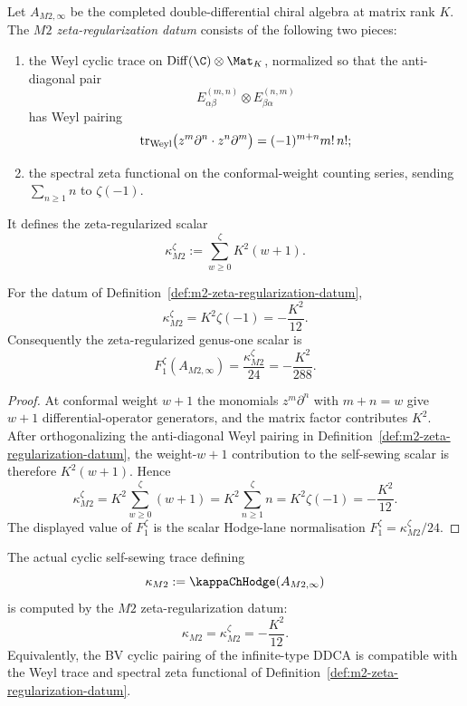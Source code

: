 \begin{definition}
\label{def:m2-zeta-regularization-datum}
Let \(A_{M2,\infty}\) be the completed double-differential chiral
algebra at matrix rank \(K\).  The \emph{\(M2\) zeta-regularization
datum} consists of the following two pieces:
\begin{enumerate}[label=\textup{(\roman*)},leftmargin=1.8em]
\item the Weyl cyclic trace on \(\Diff(\C)\otimes\Mat_K\), normalized
so that the anti-diagonal pair
\[
E^{(m,n)}_{\alpha\beta}\otimes E^{(n,m)}_{\beta\alpha}
\]
has Weyl pairing
\[
\operatorname{tr}_{\mathrm{Weyl}}\bigl(z^m\partial^n\cdot z^n\partial^m\bigr)
=(-1)^{m+n}m!\,n!;
\]
\item the spectral zeta functional on the conformal-weight counting
series, sending \(\sum_{n\ge1} n\) to \(\zeta(-1)\).
\end{enumerate}
It defines the zeta-regularized scalar
\[
\kappa_{M2}^{\zeta}
:=\sum_{w\ge0}^{\zeta} K^2(w+1).
\]
\end{definition}

\begin{proposition}
\label{prop:m2-zeta-regularized-kappa}
For the datum of Definition~\ref{def:m2-zeta-regularization-datum},
\[
\kappa_{M2}^{\zeta}=K^2\zeta(-1)=-\frac{K^2}{12}.
\]
Consequently the zeta-regularized genus-one scalar is
\[
F_1^{\zeta}(A_{M2,\infty})
=\frac{\kappa_{M2}^{\zeta}}{24}
=-\frac{K^2}{288}.
\]
\end{proposition}

\begin{proof}
At conformal weight \(w+1\) the monomials \(z^m\partial^n\) with
\(m+n=w\) give \(w+1\) differential-operator generators, and the
matrix factor contributes \(K^2\).  After orthogonalizing the
anti-diagonal Weyl pairing in Definition~\ref{def:m2-zeta-regularization-datum},
the weight-\(w+1\) contribution to the self-sewing scalar is therefore
\(K^2(w+1)\).  Hence
\[
\kappa_{M2}^{\zeta}
=K^2\sum_{w\ge0}^{\zeta}(w+1)
=K^2\sum_{n\ge1}^{\zeta}n
=K^2\zeta(-1)
=-\frac{K^2}{12}.
\]
The displayed value of \(F_1^{\zeta}\) is the scalar Hodge-lane
normalisation
\(F_1^{\zeta}=\kappa_{M2}^{\zeta}/24\).
\end{proof}

\begin{conjecture}
\label{conj:m2-zeta-comparison}
The actual cyclic self-sewing trace defining
\[
\kappa_{M2}:=\kappaChHodge(A_{M2,\infty})
\]
is computed by the \(M2\) zeta-regularization datum:
\[
\kappa_{M2}=\kappa_{M2}^{\zeta}=-\frac{K^2}{12}.
\]
Equivalently, the BV cyclic pairing of the infinite-type DDCA is
compatible with the Weyl trace and spectral zeta functional of
Definition~\ref{def:m2-zeta-regularization-datum}.
\end{conjecture}

